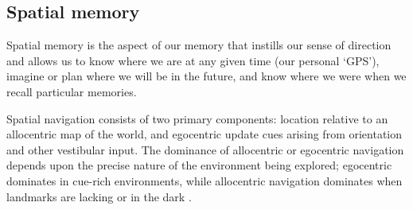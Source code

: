 

\subsection{Spatial memory}\label{sec:intro:memory:spatial}
Spatial memory is the aspect of our memory that instills our sense of direction and allows us to know where we are at any given time (our personal `GPS'), imagine or plan where we will be in the future, and know where we were when we recall particular memories.


Spatial navigation consists of two primary components: location relative to an allocentric map of the world, and egocentric update cues arising from orientation and other vestibular input.
The dominance of allocentric or egocentric navigation depends upon the precise nature of the environment being explored; egocentric dominates in cue-rich environments, while allocentric navigation dominates when landmarks are lacking or in the dark \citep{Knierim1998}.

